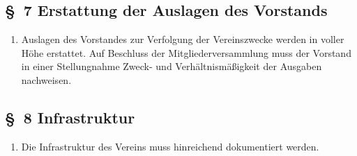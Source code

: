 \documentclass[10pt,a4paper]{article}
\begin{document}
\subsection*{\S \ 7 Erstattung der Auslagen des Vorstands}
\begin{enumerate}
\item Auslagen des Vorstandes zur Verfolgung der Vereinszwecke werden
	in voller H{\"o}he erstattet. Auf Beschluss der Mitgliederversammlung
	muss der Vorstand in einer Stellungnahme Zweck- und Verh{\"a}ltnis\-m{\"a}{\ss}igkeit
	der Ausgaben nachweisen.
\end{enumerate}
%
%
\subsection*{\S \ 8 Infrastruktur}
%
\begin{enumerate}
\item Die Infrastruktur des Vereins muss hinreichend dokumentiert werden.
\end{enumerate}
\end{document}
